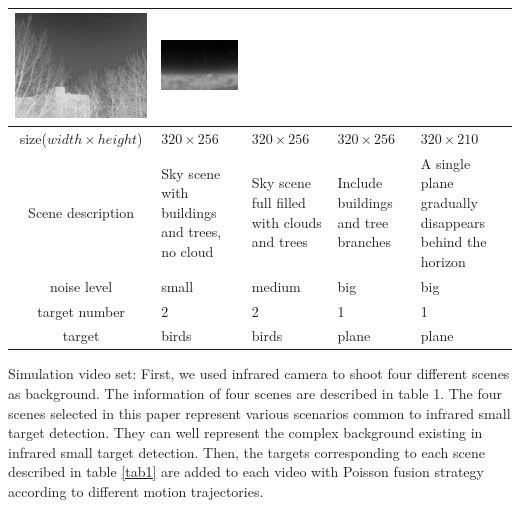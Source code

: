 \documentclass[journal]{IEEEtran}
\begin{document}
\begin{table}[ht]
\begin{tabular}{|c|m{3cm}<{\centering}|m{3cm}<{\centering}|m{3cm}<{\centering}|m{3.2cm}<{\centering}|}
    \includegraphics[scale=0.26]{real-back3.png}& 
    \includegraphics[scale=0.29]{real-back4.png}\\
    \hline
    size($width \times height$)& $320 \times 256$& $320 \times 256$& $320 \times 256$& $320\times 210$\\
    \hline
    Scene description& Sky scene with buildings and trees, no cloud & Sky scene full filled with clouds and trees & Include buildings and tree branches & A single plane gradually disappears behind the horizon\\
    \hline
    noise level & small & medium & big & big \\
    \hline
    target number & 2 & 2 & 1 & 1 \\
    \hline
    target & birds & birds & plane & plane \\
    \hline
  \end{tabular}
\end{table}

Simulation video set: First, we used infrared camera to shoot four different scenes as background. The information of four scenes are described in table 1. The four scenes selected in this paper represent various scenarios common to infrared small target detection. They can well represent the complex background existing in infrared small target detection. Then, the targets corresponding to each scene described in table \ref{tab1} are added to each video with Poisson fusion strategy\cite{perez2003poisson} according to different motion trajectories.
\end{document}
